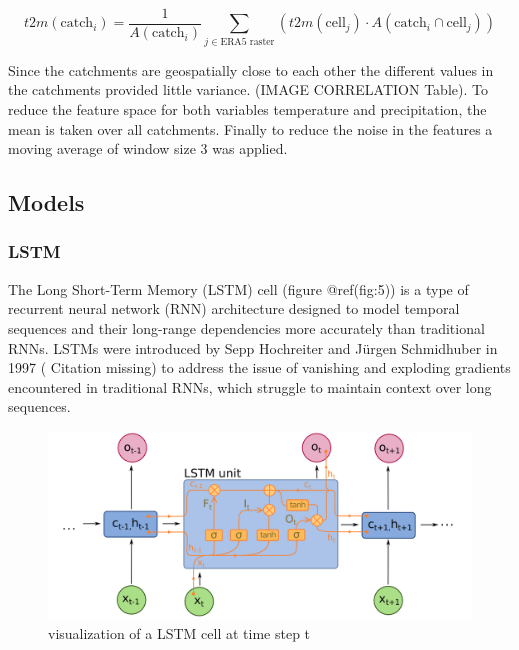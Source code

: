 \documentclass[
]{article}
\begin{document}
\[ t2m(\text{catch}_i) = \frac{1}{A(\text{catch}_i)} \sum_{j \in \text{ERA5 raster}} \left( t2m(\text{cell}_j) \cdot A(\text{catch}_i \cap \text{cell}_j) \right) \tag{1} \]

Since the catchments are geospatially close to each other the different
values in the catchments provided little variance. (IMAGE CORRELATION
Table). To reduce the feature space for both variables temperature and
precipitation, the mean is taken over all catchments. Finally to reduce
the noise in the features a moving average of window size 3 was applied.

\hypertarget{models}{%
\subsection{Models}\label{models}}

\hypertarget{lstm}{%
\subsubsection{LSTM}\label{lstm}}

The Long Short-Term Memory (LSTM) cell (figure @ref(fig:5)) is a type of
recurrent neural network (RNN) architecture designed to model temporal
sequences and their long-range dependencies more accurately than
traditional RNNs. LSTMs were introduced by Sepp Hochreiter and Jürgen
Schmidhuber in 1997 ( Citation missing) to address the issue of
vanishing and exploding gradients encountered in traditional RNNs, which
struggle to maintain context over long sequences.

\begin{figure}

{\centering \includegraphics[width=500]{work/07-hydroLSTM/images/LSTM} 

}

\caption{visualization of a LSTM cell at time step t}\label{fig:5}
\end{figure}
\end{document}
